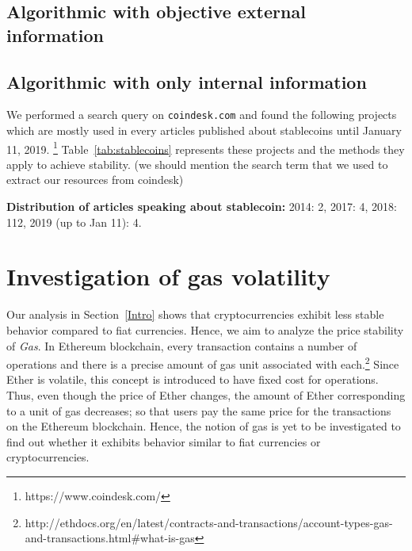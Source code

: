\subsection{Algorithmic with objective external information} 

\subsection{Algorithmic with only internal information} 

We performed a search query on \texttt{coindesk.com} and found the following projects which are mostly used in every articles published about stablecoins until January 11, 2019. \footnote{https://www.coindesk.com/} Table~\ref{tab:stablecoins} represents these projects and the methods they apply to achieve stability. (we should mention the search term that we used to extract our resources from coindesk)


\textbf{Distribution of articles speaking about stablecoin:} 2014: 2, 2017: 4, 2018: 112, 2019 (up to Jan 11): 4.



\section{Investigation of gas volatility}
 \par
Our analysis in Section~\ref{Intro} shows that cryptocurrencies exhibit less stable behavior compared to fiat currencies. Hence, we aim to analyze the price stability of \emph{Gas}. In Ethereum blockchain, every transaction contains a number of operations and there is a precise amount of gas unit associated with each.\footnote{http://ethdocs.org/en/latest/contracts-and-transactions/account-types-gas-and-transactions.html\#what-is-gas} Since Ether is volatile, this concept is introduced to have fixed cost for operations. Thus, even though the price of Ether changes, the amount of Ether corresponding to a unit of gas decreases; so that users pay the same price for the transactions on the Ethereum blockchain. Hence, the notion of gas is yet to be investigated to find out whether it exhibits behavior similar to fiat currencies or cryptocurrencies.

